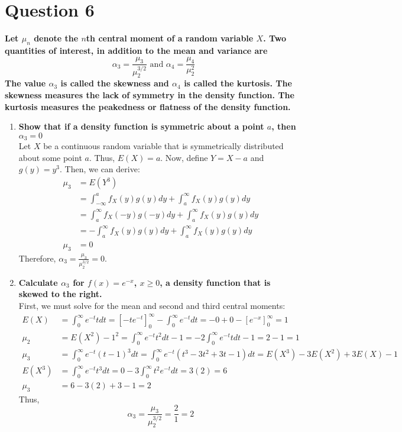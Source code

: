 \documentclass{article}
\begin{document}
\section*{Question 6}
\textbf{Let $\mu_n$ denote the $n$th central moment of a random variable $X$. Two quantities of interest, in addition to the mean and variance are}
\[
	\alpha_3 = \dfrac{\mu_3}{\mu_2^{3/2}}\text{ and }\alpha_4=\dfrac{\mu_4}{\mu_2^2}
\]
\textbf{The value $\alpha_3$ is called the skewness and $\alpha_4$ is called the kurtosis. The skewness measures the lack of symmetry in the density function. The kurtosis measures the peakedness or flatness of the density function.}
\begin{enumerate}
	\item \textbf{Show that if a density function is symmetric about a point $a$, then $\alpha_3=0$}
		\bigskip \\
		Let $X$ be a continuous random variable that is symmetrically distributed about some point $a$. Thus, $E(X)=a$. Now, define $Y=X-a$ and $g(y)=y^3$. Then, we can derive:
		\begin{align*}
			\mu_3 	&= E(Y^3) 																\\
					&= \int_{-\infty}^a f_X(y)g(y)dy 	+ \int^{\infty}_a f_X(y)g(y)dy		\\
					&= \int^{\infty}_a f_X(-y)g(-y)dy	+ \int^{\infty}_a f_X(y)g(y)dy		\\
					&= -\int^{\infty}_a f_X(y)g(y)dy	+ \int^{\infty}_a f_X(y)g(y)dy		\\
			\mu_3 	&= 0
		\end{align*}
		Therefore, $\alpha_3 = \frac{\mu_3}{\mu_2^{3/2}} = 0$.
		
	\item \textbf{Calculate $\alpha_3$ for $f(x)=e^{-x}$, $x\geq0$, a density function that is skewed to the right.}
		\bigskip \\
		First, we must solve for the mean and second and third central moments:
		\begin{align*}
			E(X)	&= \int^\infty_0 e^{-t}tdt = [-te^{-t}]^\infty_0-\int^\infty_0 e^{-t}dt = -0+0-[e^{-x}]^\infty_0 = 1	\\
			\mu_2	&= E(X^2) - 1^2 = \int^\infty_0 e^{-t}t^2dt-1 = -2\int^\infty_0 e^{-t}tdt-1 = 2-1 = 1					\\
			\mu_3	&= \int_0^\infty e^{-t}(t-1)^3dt = \int_0^\infty e^{-t}(t^3-3t^2+3t-1)dt = E(X^3) - 3E(X^2) + 3E(X) - 1	\\
			E(X^3)	&= \int^\infty_0 e^{-t}t^3dt = 0 - 3\int_0^\infty t^2e^{-t}dt = 3(2)=6\\
			\mu_3	&= 6 - 3(2)+3-1 = 2
		\end{align*}
		Thus,
		\[
			\alpha_3 = \dfrac{\mu_3}{\mu_2^{3/2}} = \dfrac{2}{1}=2
		\]
		

\end{enumerate}
\end{document}
